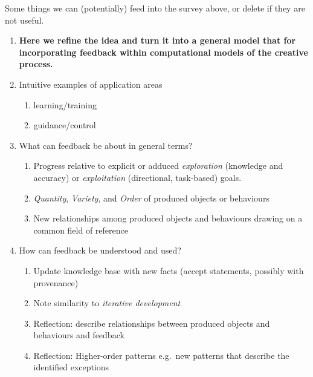 \begin{mdframed}
{\large Some things we can (potentially) feed into the survey above,
  or delete if they are not useful.}

\begin{enumerate}[start=2]
\item \textbf{Here we refine the idea and turn it into a general model
  that for incorporating feedback within computational models of the
  creative process.}
\item[] Intuitive examples of application areas
\begin{enumerate}
\item learning/training
\item guidance/control
\end{enumerate}
\item[] What can feedback be about in general terms? 
\begin{enumerate}
\item Progress relative to explicit or adduced \emph{exploration}
  (knowledge and accuracy) or \emph{exploitation} (directional,
  task-based) goals.
\item \emph{Quantity}, \emph{Variety}, and \emph{Order} of produced
  objects or behaviours
\item New relationships among produced objects and behaviours drawing
  on a common field of reference
\end{enumerate}
\item[] How can feedback be understood and used? 
\begin{enumerate}
\item Update knowledge base with new facts (accept statements,
  possibly with provenance)
\item Note similarity to \emph{iterative development}
\item Reflection: describe relationships between produced objects and
  behaviours and feedback
\item Reflection: Higher-order patterns e.g.~new patterns that
  describe the identified exceptions
\end{enumerate}
\end{enumerate}


\end{mdframed}
